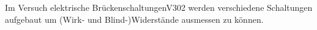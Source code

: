 Im Versuch \glqq elektrische Brückenschaltungen\grqq  V302 werden verschiedene Schaltungen aufgebaut um (Wirk- und Blind-)Widerstände ausmessen zu können. 
